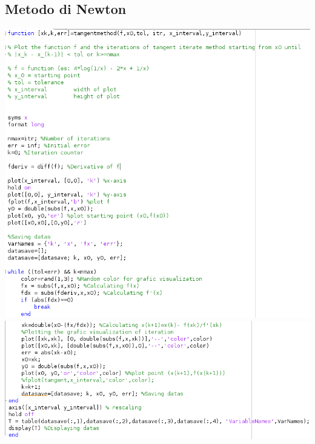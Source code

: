\documentclass[12pt, letterpaper]{article}
\begin{document}
\subsection{Metodo di Newton}
\includegraphics[scale=0.86]{ProgrammaNewton1.png}\\
\includegraphics[scale=0.86]{ProgrammaNewton2.png}
\newpage
\end{document}
